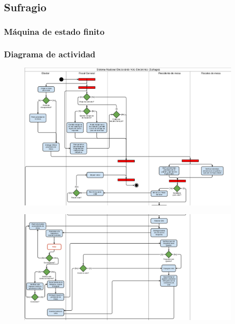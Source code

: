 \subsection{Sufragio}

\subsubsection{Máquina de estado finito}

\subsubsection{Diagrama de actividad}
\begin{figure}[h!]
\centering
\includegraphics[scale=0.5]{imagenes/actividad/actividadSufragio1}
\end{figure}

\begin{figure}[h!]
\centering
\includegraphics[scale=0.5]{imagenes/actividad/actividadSufragio2}
\end{figure}


